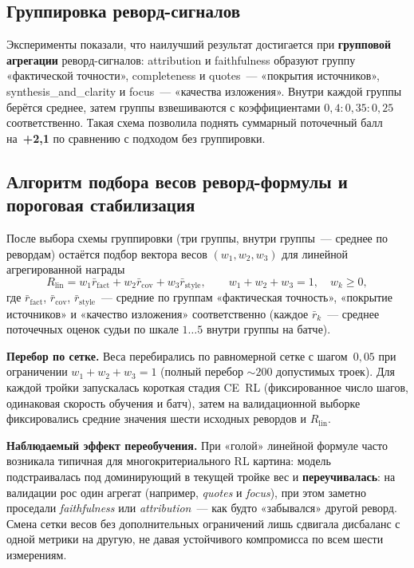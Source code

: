\documentclass[times]{itmo-student-thesis}
\begin{document}
\subsection{Группировка реворд-сигналов}

Эксперименты показали, что наилучший результат достигается при
\textbf{групповой агрегации} реворд-сигналов: attribution и faithfulness
образуют группу «фактической точности», completeness и quotes~---
«покрытия источников», synthesis\_and\_clarity и focus~--- «качества
изложения». Внутри каждой группы берётся среднее, затем группы
взвешиваются с коэффициентами $0{,}4 : 0{,}35 : 0{,}25$ соответственно.
Такая схема позволила поднять суммарный поточечный балл на~\textbf{+2{,}1}
по сравнению с подходом без группировки.

\subsection{Алгоритм подбора весов реворд-формулы и пороговая стабилизация}

После выбора схемы группировки (три группы, внутри группы~---
среднее по ревордам) остаётся подбор вектора весов
$(w_1, w_2, w_3)$ для линейной агрегированной награды
\begin{equation}
    R_{\mathrm{lin}} = w_1 \bar{r}_{\mathrm{fact}} +
    w_2 \bar{r}_{\mathrm{cov}} +
    w_3 \bar{r}_{\mathrm{style}},
    \qquad
    w_1 + w_2 + w_3 = 1,\quad w_k \ge 0,
\end{equation}
где $\bar{r}_{\mathrm{fact}}$, $\bar{r}_{\mathrm{cov}}$,
$\bar{r}_{\mathrm{style}}$~--- средние по группам
«фактическая точность», «покрытие источников» и «качество изложения»
соответственно (каждое $\bar{r}_k$~--- среднее поточечных оценок судьи
по шкале $1\ldots 5$ внутри группы на батче).

\textbf{Перебор по сетке.} Веса перебирались по равномерной сетке
с шагом~$0{,}05$ при ограничении $w_1+w_2+w_3=1$
(полный перебор $\sim 200$ допустимых троек). Для каждой тройки
запускалась короткая стадия CE~RL (фиксированное число шагов,
одинаковая скорость обучения и батч), затем на валидационной выборке
фиксировались средние значения шести исходных ревордов и
$R_{\mathrm{lin}}$.

\textbf{Наблюдаемый эффект переобучения.} При «голой» линейной формуле
часто возникала типичная для многокритериального RL картина:
модель подстраивалась под доминирующий в текущей тройке вес и
\textbf{переучивалась}: на валидации рос один агрегат (например,
\textit{quotes} и \textit{focus}), при этом заметно проседали
\textit{faithfulness} или \textit{attribution}~--- как будто
«забывался» другой реворд. Смена сетки весов без дополнительных
ограничений лишь сдвигала дисбаланс с одной метрики на другую,
не давая устойчивого компромисса по всем шести измерениям.
\end{document}

